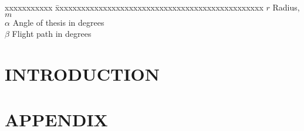 \documentclass[BTech]{iitmdiss}
\begin{document}
\begin{singlespace}
\begin{tabbing}
xxxxxxxxxxx \= xxxxxxxxxxxxxxxxxxxxxxxxxxxxxxxxxxxxxxxxxxxxxxxx \kill
\textbf{$r$}  \> Radius, $m$ \\
\textbf{$\alpha$}  \> Angle of thesis in degrees \\
\textbf{$\beta$}   \> Flight path in degrees \\
\end{tabbing}
\end{singlespace}

\pagebreak


\clearpage



\chapter{INTRODUCTION}
\label{chap:intro}
\cite{py:python}


\appendix

\chapter{APPENDIX}


\begin{singlespace}
  
\end{singlespace}
\end{document}
